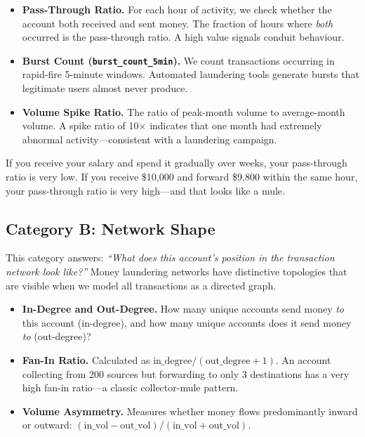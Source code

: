 \documentclass[11pt, a4paper]{article}
\begin{document}
\begin{itemize}[leftmargin=1.5em, itemsep=4pt]
    \item \textbf{Pass-Through Ratio.}\quad
          For each hour of activity, we check whether the account both received and sent
          money. The fraction of hours where \emph{both} occurred is the pass-through ratio.
          A high value signals conduit behaviour.

    \item \textbf{Burst Count (\texttt{burst\_count\_5min}).}\quad
          We count transactions occurring in rapid-fire 5-minute windows. Automated laundering
          tools generate bursts that legitimate users almost never produce.

    \item \textbf{Volume Spike Ratio.}\quad
          The ratio of peak-month volume to average-month volume. A spike ratio of 10$\times$
          indicates that one month had extremely abnormal activity---consistent with a
          laundering campaign.
\end{itemize}

\begin{insightbox}
If you receive your salary and spend it gradually over weeks, your pass-through ratio is
very low. If you receive \$10,000 and forward \$9,800 within the same hour, your
pass-through ratio is very high---and that looks like a mule.
\end{insightbox}

\subsection{Category B: Network Shape}

This category answers: \emph{``What does this account's position in the transaction network
look like?''} Money laundering networks have distinctive topologies that are visible when we
model all transactions as a directed graph.

\begin{itemize}[leftmargin=1.5em, itemsep=4pt]
    \item \textbf{In-Degree and Out-Degree.}\quad
          How many unique accounts send money \emph{to} this account (in-degree), and how
          many unique accounts does it send money \emph{to} (out-degree)?

    \item \textbf{Fan-In Ratio.}\quad
          Calculated as $\text{in\_degree} / (\text{out\_degree} + 1)$. An account
          collecting from 200 sources but forwarding to only 3 destinations has a very
          high fan-in ratio---a classic collector-mule pattern.

    \item \textbf{Volume Asymmetry.}\quad
          Measures whether money flows predominantly inward or outward:
          $(\text{in\_vol} - \text{out\_vol}) / (\text{in\_vol} + \text{out\_vol})$.
\end{itemize}
\end{document}
